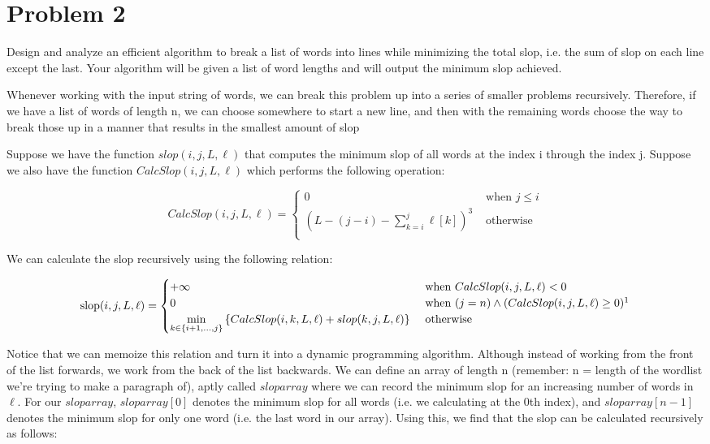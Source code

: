 \documentclass[11pt, letterpaper]{article}
\begin{document}
\pagebreak
\section*{Problem 2}

\quad Design and analyze an efficient algorithm to break a list of words into lines while minimizing the total slop, i.e. the sum of slop on each line except the last. Your algorithm will be given a list of word lengths and will output the minimum slop achieved.

\bigbreak Whenever working with the input string of words, we can break this problem up into a series of smaller problems recursively. Therefore, if we have a list of words of length n, we can choose somewhere to start a new line, and then with the remaining words choose the way to break those up in a manner that results in the smallest amount of slop

\quad Suppose we have the function $slop(i, j, L, \ell)$ that computes the minimum slop of all words at the index i through the index j. Suppose we also have the function $CalcSlop(i, j, L, \ell)$ which performs the following operation:

\[
CalcSlop(i, j, L, \ell) = 
\begin{cases}
0 & \text{ when } j \leq i \\
\left( L - (j - i) - \sum_{k = i}^j \ell[k] \right)^3  & \text{ otherwise} \\
\end{cases}
\]

\quad We can calculate the slop recursively using the following relation:

\[
\text{slop}(i, j, L, \ell) = 
\begin{cases}
+\infty & \text{ when } CalcSlop(i, j, L, \ell) < 0 \\
0 & \text{ when } (j = n) \wedge (CalcSlop(i, j, L, \ell) \geq 0) \footnotemark \\
\underset{k \in \{i+1, ..., j\}}{\min} \left\{ CalcSlop(i, k, L, \ell) + slop(k, j, L, \ell) \right\} & \text{ otherwise} \\
\end{cases}
\]

\quad Notice that we can memoize this relation and turn it into a dynamic programming algorithm. Although instead of working from the front of the list forwards, we work from the back of the list backwards. We can define an array of length n (remember: n = length of the wordlist we're trying to make a paragraph of), aptly called $sloparray$ where we can record the minimum slop for an increasing number of words in $\ell$. For our $sloparray$, $sloparray[0]$ denotes the minimum slop for all words (i.e. we calculating at the 0th index), and $sloparray[n - 1]$ denotes the minimum slop for only one word (i.e. the last word in our array). Using this, we find that the slop can be calculated recursively as follows:
\end{document}
